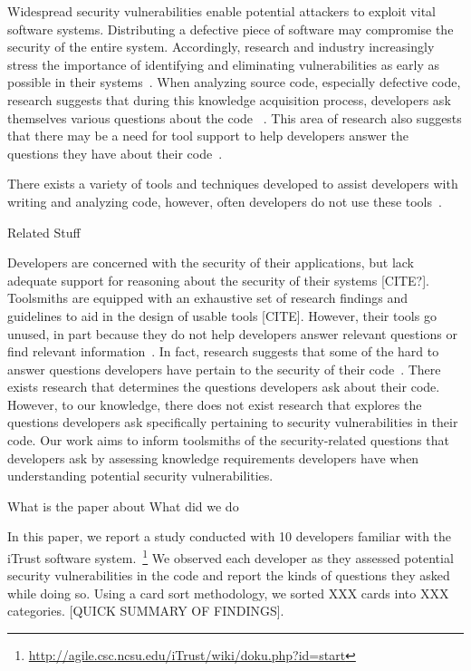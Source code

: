\documentclass[conference]{IEEEtran}
\begin{document}
Widespread security vulnerabilities enable potential attackers to exploit vital software systems. Distributing a defective piece of software may compromise the security of the entire system. Accordingly, research and industry increasingly stress the importance of identifying and eliminating  vulnerabilities as early as possible in their systems~\cite{austin2011one, bessey2010few}. When analyzing source code, especially defective code, research suggests that during this knowledge acquisition process, developers ask themselves various questions about the code ~\cite{latoza2010hard, ko2004designing}. This area of research also suggests that there may be a need for tool support to help developers answer the questions they have about their code~\cite{latoza2010hard}. 

There exists a variety of tools and techniques developed to assist developers with writing and analyzing code, however, often developers do not use these tools~\cite{}.

Related Stuff

Developers are concerned with the security of their applications, but lack adequate support for reasoning about the security of their systems [CITE?].
Toolsmiths are equipped with an exhaustive set of research findings and guidelines to aid in the design of usable tools [CITE]. 
However, their tools go unused, in part because they do not help developers answer relevant questions or find relevant information~\cite{johnson2013don, latoza2010hard}. In fact, research suggests that some of the hard to answer questions developers have pertain to the security of their code~\cite{latoza2010hard}. There exists research that determines the questions developers ask about their code. However, to our knowledge, there does not exist research that explores the questions developers ask specifically pertaining to security vulnerabilities in their code. Our work aims to inform toolsmiths of the security-related questions that developers ask by assessing knowledge requirements developers have when understanding potential security vulnerabilities.


What is the paper about
	What did we do

In this paper, we report a study conducted with 10 developers familiar with the iTrust software system.~\footnote{\url{http://agile.csc.ncsu.edu/iTrust/wiki/doku.php?id=start}} We observed each developer as they assessed potential security vulnerabilities in the code and report the kinds of questions they asked while doing so. Using a card sort methodology, we sorted XXX cards into XXX categories. [QUICK SUMMARY OF FINDINGS]. 
\end{document}
